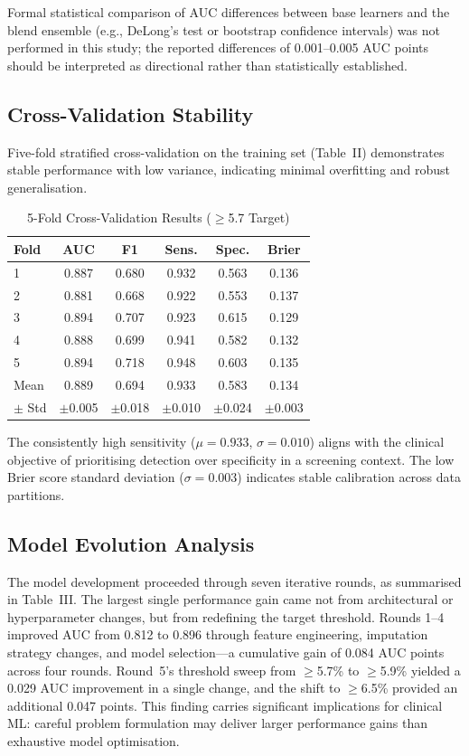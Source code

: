 \documentclass[conference]{IEEEtran}
\begin{document}
Formal statistical comparison of AUC differences between base learners and the blend ensemble (e.g., DeLong's test or bootstrap confidence intervals) was not performed in this study; the reported differences of 0.001--0.005 AUC points should be interpreted as directional rather than statistically established.

\subsection{Cross-Validation Stability}

Five-fold stratified cross-validation on the training set (Table~II) demonstrates stable performance with low variance, indicating minimal overfitting and robust generalisation.

\begin{table}[htbp]
\caption{5-Fold Cross-Validation Results ($\geq$5.7 Target)}
\label{tab:cv}
\centering
\begin{tabular}{lccccc}
\toprule
\textbf{Fold} & \textbf{AUC} & \textbf{F1} & \textbf{Sens.} & \textbf{Spec.} & \textbf{Brier} \\
\midrule
1 & 0.887 & 0.680 & 0.932 & 0.563 & 0.136 \\
2 & 0.881 & 0.668 & 0.922 & 0.553 & 0.137 \\
3 & 0.894 & 0.707 & 0.923 & 0.615 & 0.129 \\
4 & 0.888 & 0.699 & 0.941 & 0.582 & 0.132 \\
5 & 0.894 & 0.718 & 0.948 & 0.603 & 0.135 \\
\midrule
Mean & 0.889 & 0.694 & 0.933 & 0.583 & 0.134 \\
$\pm$ Std & $\pm$0.005 & $\pm$0.018 & $\pm$0.010 & $\pm$0.024 & $\pm$0.003 \\
\bottomrule
\end{tabular}
\end{table}

The consistently high sensitivity ($\mu = 0.933$, $\sigma = 0.010$) aligns with the clinical objective of prioritising detection over specificity in a screening context. The low Brier score standard deviation ($\sigma = 0.003$) indicates stable calibration across data partitions.

\subsection{Model Evolution Analysis}

The model development proceeded through seven iterative rounds, as summarised in Table~III. The largest single performance gain came not from architectural or hyperparameter changes, but from redefining the target threshold. Rounds 1--4 improved AUC from 0.812 to 0.896 through feature engineering, imputation strategy changes, and model selection---a cumulative gain of 0.084 AUC points across four rounds. Round~5's threshold sweep from $\geq$5.7\% to $\geq$5.9\% yielded a 0.029 AUC improvement in a single change, and the shift to $\geq$6.5\% provided an additional 0.047 points. This finding carries significant implications for clinical ML: careful problem formulation may deliver larger performance gains than exhaustive model optimisation.
\end{document}
